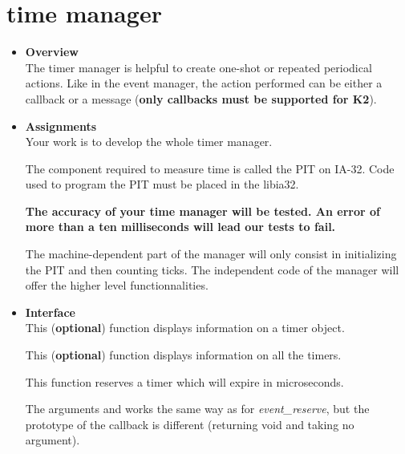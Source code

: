 %
%

\newpage

\section{\textbf{time} manager}
\begin{itemize}
  \item {\bf Overview}\\

    The timer manager is helpful to create one-shot or repeated
    periodical actions. Like in the event manager, the action
    performed can be either a callback or a message (\textbf{only
    callbacks must be supported for K2}).

  \item {\bf Assignments}\\

    Your work is to develop the whole timer manager.

    The component required to measure time is called the PIT on
    IA-32. Code used to program the PIT must be placed in the libia32.

    \textbf{The accuracy of your time manager will be tested. An error
    of more than a ten milliseconds will lead our tests to fail.}

    The machine-dependent part of the manager will only consist in
    initializing the PIT and then counting ticks. The independent code
    of the manager will offer the higher level functionnalities.

  \item {\bf Interface}\\

	 {
	   This (\textbf{optional}) function displays information on a
	   timer object.
	 }

	 {
	   This (\textbf{optional}) function displays information on
	   all the timers.
	 }

	 {
	   This function reserves a timer which will expire in
	    microseconds.

	   The arguments  and  works
	   the same way as for \emph{event\_reserve}, but the
	   prototype of the callback is different (returning void and
	   taking no argument).

}
\end{itemize}
